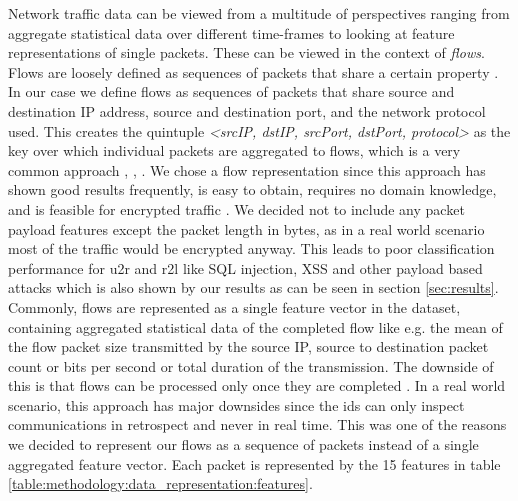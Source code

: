 Network traffic data can be viewed from a multitude of perspectives ranging from aggregate statistical data over different time-frames \cite{kitsune} to looking at feature representations of single packets. These can be viewed in the context of \textit{flows}.
Flows are loosely defined as sequences of packets that share a certain property \cite{adversarial_recurrent_ids}. In our case we define flows as sequences of packets that share source and destination IP address, source and destination port, and the network protocol used. This creates the quintuple \textit{<srcIP, dstIP, srcPort, dstPort, protocol>} as the key over which individual packets are aggregated to flows, which is a very common approach \cite{caia_vector}, \cite{unsw_nb15}, \cite{feature_vectors}. We chose a flow representation since this approach has shown good results frequently, is easy to obtain, requires no domain knowledge, and is feasible for encrypted traffic \cite{feature_vectors}. We decided not to include any packet payload features except the packet length in bytes, as in a real world scenario most of the traffic would be encrypted anyway. This leads to poor classification performance for \gls{u2r} and \gls{r2l} \cite{nsl_kdd} like SQL injection, XSS and other payload based attacks which is also shown by our results as can be seen in section \ref{sec:results}. Commonly, flows are represented as a single feature vector in the dataset, containing aggregated statistical data of the completed flow like e.g. the mean of the flow packet size transmitted by the source IP, source to destination packet count or bits per second or total duration of the transmission. The downside of this is that flows can be processed only once they are completed \cite{adversarial_recurrent_ids}. In a real world scenario, this approach has major downsides since the \gls{ids} can only inspect communications in retrospect and never in real time. This was one of the reasons we decided to represent our flows as a sequence of packets instead of a single aggregated feature vector. Each packet is represented by the 15 features in table \ref{table:methodology:data_representation:features}.

